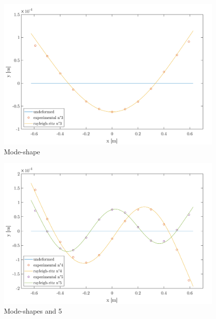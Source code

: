 \documentclass[a4paper, 12pt]{article}
\begin{document}
	\begin{figure}[h]
		\centering
		\includegraphics[width=1\textwidth]{resources/pdf/mode-shape3.pdf}
		\caption{Mode-shape }
		\label{figure:modeshape3}
	\end{figure}
	\begin{figure}[h]
		\centering
		\includegraphics[width=1\textwidth]{resources/pdf/mode-shapes4and5.pdf}
		\caption{Mode-shapes  and 5}
		\label{figure:modeshape45}
	\end{figure}
	\clearpage
\end{document}

